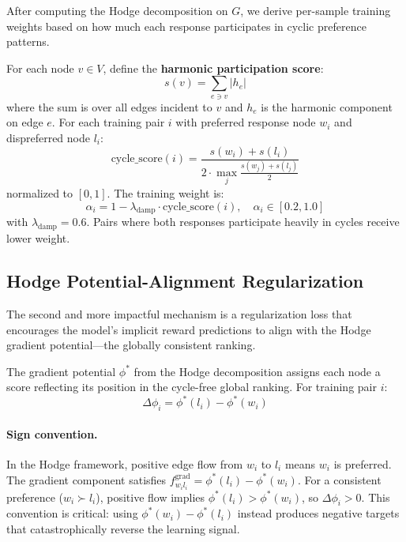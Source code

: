 \documentclass{article}
\begin{document}
After computing the Hodge decomposition on $G$, we derive per-sample training weights based on how much each response participates in cyclic preference patterns.

For each node $v \in V$, define the \textbf{harmonic participation score}:
\begin{equation}
    s(v) = \sum_{e \ni v} |h_e|
\end{equation}
where the sum is over all edges incident to $v$ and $h_e$ is the harmonic component on edge $e$. For each training pair $i$ with preferred response node $w_i$ and dispreferred node $l_i$:
\begin{equation}
    \text{cycle\_score}(i) = \frac{s(w_i) + s(l_i)}{2 \cdot \max_j \frac{s(w_j) + s(l_j)}{2}}
\end{equation}
normalized to $[0, 1]$. The training weight is:
\begin{equation}
    \alpha_i = 1 - \lambda_\text{damp} \cdot \text{cycle\_score}(i), \quad \alpha_i \in [0.2, 1.0]
\label{eq:weights}
\end{equation}
with $\lambda_\text{damp} = 0.6$. Pairs where both responses participate heavily in cycles receive lower weight.

\subsection{Hodge Potential-Alignment Regularization}
\label{sec:potential_alignment}

The second and more impactful mechanism is a regularization loss that encourages the model's implicit reward predictions to align with the Hodge gradient potential---the globally consistent ranking.

The gradient potential $\phi^*$ from the Hodge decomposition assigns each node a score reflecting its position in the cycle-free global ranking. For training pair $i$:
\begin{equation}
    \Delta\phi_i = \phi^*(l_i) - \phi^*(w_i)
\label{eq:potential_diff}
\end{equation}

\paragraph{Sign convention.} In the Hodge framework, positive edge flow from $w_i$ to $l_i$ means $w_i$ is preferred. The gradient component satisfies $f_{w_i l_i}^\text{grad} = \phi^*(l_i) - \phi^*(w_i)$. For a consistent preference ($w_i \succ l_i$), positive flow implies $\phi^*(l_i) > \phi^*(w_i)$, so $\Delta\phi_i > 0$. This convention is critical: using $\phi^*(w_i) - \phi^*(l_i)$ instead produces negative targets that catastrophically reverse the learning signal.
\end{document}
